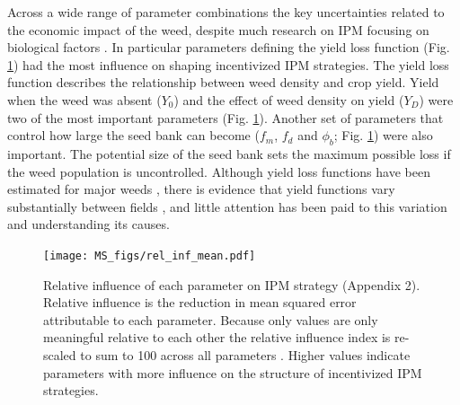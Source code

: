 \documentclass[12pt, a4paper]{article}
\begin{document}
Across a wide range of parameter combinations the key uncertainties related to the economic impact of the weed, despite much research on IPM focusing on biological factors \citep{Colb2006}. In particular parameters defining the yield loss function (Fig. \ref{fig:rel_inf}) had the most influence on shaping incentivized IPM strategies. The yield loss function describes the relationship between weed density and crop yield. Yield when the weed was absent ($Y_0$) and the effect of weed density on yield ($Y_D$) were two of the most important parameters (Fig. \ref{fig:rel_inf}). Another set of parameters that control how large the seed bank can become ($f_m$, $f_d$ and $\phi_b$; Fig. \ref{fig:rel_inf}) were also important. The potential size of the seed bank sets the maximum possible loss if the weed population is uncontrolled. Although yield loss functions have been estimated for major weeds \citep{Cous1985, Doyl1986, Swin1994}, there is evidence that yield functions vary substantially between fields \citep{Swin1994, Hick2018}, and little attention has been paid to this variation and understanding its causes.
 \begin{figure}
	\centering
	\texttt{[image: MS\_figs/rel\_inf\_mean.pdf]}
	\caption{Relative influence of each parameter on IPM strategy (Appendix 2). Relative influence is the reduction in mean squared error attributable to each parameter. Because only values are only meaningful relative to each other the relative influence index is re-scaled to sum to 100 across all parameters \citep{Frie2001, Mill2016}. Higher values indicate parameters with more influence on the structure of incentivized IPM strategies.}
	\label{fig:rel_inf} 
\end{figure}
\end{document}
